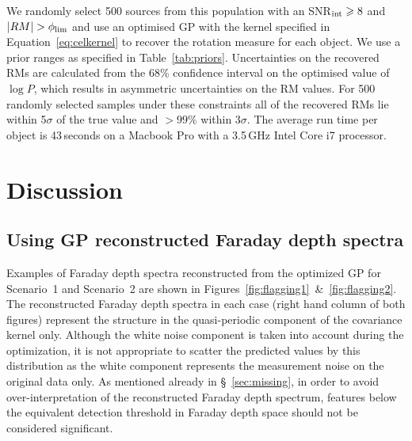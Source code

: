 \documentclass[fleqn,usenatbib]{mnras}
\begin{document}
We randomly select 500 sources from this population with an SNR$_{\rm int}\ge8$ and $|RM|>\phi_{\rm lim}$ and use an optimised GP with the kernel specified in Equation~\ref{eq:celkernel} to recover the rotation measure for each object. We use a prior ranges as specified in Table~\ref{tab:priors}.  
Uncertainties on the recovered RMs are calculated from the 68\% confidence interval on the optimised value of $\log P$, which results in asymmetric uncertainties on the RM values. For 500 randomly selected samples under these constraints all of the recovered RMs lie within 5$\sigma$ of the true value and $>99\%$ within 3$\sigma$. The average run time per object is 43\,seconds on a Macbook Pro with a 3.5\,GHz Intel Core i7 processor.
%




\section{Discussion}
\label{sec:disc}

\subsection{Using GP reconstructed Faraday depth spectra}
\label{sec:usage}

Examples of Faraday depth spectra reconstructed from the optimized GP for Scenario~1 and Scenario~2 are shown in Figures~\ref{fig:flagging1}~\&~\ref{fig:flagging2}. The reconstructed Faraday depth spectra in each case (right hand column of both figures) represent the structure in the quasi-periodic component of the covariance kernel only. Although the white noise component is taken into account during the optimization, it is not appropriate to scatter the predicted values by this distribution as the white component represents the measurement noise on the original data only. As mentioned already in \S~\ref{sec:missing}, in order to avoid over-interpretation of the reconstructed Faraday depth spectrum, features below the equivalent detection threshold in Faraday depth space should not be considered significant. 
\end{document}
